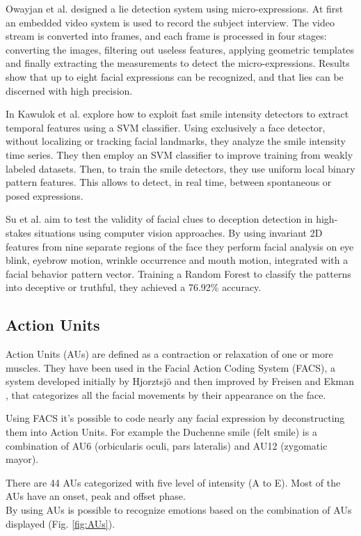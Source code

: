 Owayjan et al. \cite{6462897} designed a lie detection system using micro-expressions. At first an embedded video system is used to record the subject interview. The video stream is converted into frames, and each frame is processed in four stages: converting the images, filtering out useless features, applying geometric templates and finally extracting the measurements to detect the micro-expressions. Results show that up to eight facial expressions can be recognized, and that lies can be discerned with high precision.

In \cite{10.1007/978-3-319-47955-2_27} Kawulok et al. explore how to exploit fast smile intensity detectors to extract temporal features using a SVM classifier. Using exclusively a face detector, without localizing or tracking facial landmarks, they analyze the smile intensity time series. They then employ an SVM classifier to improve training from weakly labeled datasets. Then, to train the smile detectors, they use uniform local binary pattern features. This allows to detect, in real time, between spontaneous or posed expressions.

Su et al. \cite{SU201652} aim to test the validity of facial clues to deception detection in high-stakes situations using computer vision approaches. By using invariant 2D features from nine separate regions of the face they perform facial analysis on eye blink, eyebrow motion, wrinkle occurrence and mouth motion, integrated with a facial behavior pattern vector. Training a Random Forest to classify the patterns into deceptive or truthful, they achieved a 76.92\% accuracy.

\subsection{Action Units} \label{au}
Action Units (AUs) are defined as a contraction or relaxation of one or more muscles. They have been used in the Facial Action Coding System (FACS), a system developed initially by Hjorztsjö \cite{facsCH} and then improved by Freisen and Ekman \cite{facs1978}, that categorizes all the facial movements by their appearance on the face.

Using FACS it's possible to code nearly any facial expression by deconstructing them into Action Units. For example the Duchenne smile (felt smile) is a combination of AU6 (orbicularis oculi, pars lateralis) and AU12 (zygomatic mayor).

There are 44 AUs categorized with five level of intensity (A to E). Most of the AUs have an onset, peak and offset phase. \\
By using AUs is possible to recognize emotions based on the combination of AUs displayed (Fig. \ref{fig:AUs}).

